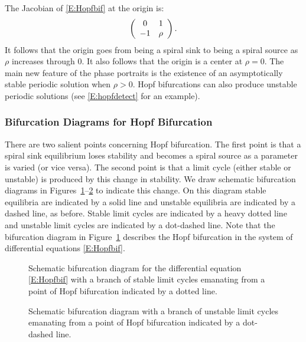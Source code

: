 \documentclass{ximera}
\begin{document}
The Jacobian of \eqref{E:Hopfbif} at the origin is:
\[
\left(\begin{array}{cc} 0 & 1\\ -1 &\rho\end{array}\right).
\]
It follows that the origin goes from being a 
spiral sink to being a 
spiral source 
as $\rho$ increases through $0$.  It also follows that  
the origin is a center at $\rho=0$.  
The main new feature of the phase portraits is the 
existence of an asymptotically stable 
periodic solution when $\rho>0$.  
Hopf bifurcations can also produce unstable periodic solutions
 (see \eqref{E:hopfdetect} for an example).   

\subsubsection*{Bifurcation Diagrams for Hopf Bifurcation}

There are two salient points concerning Hopf bifurcation.  The first point is 
that a spiral sink equilibrium loses stability and becomes a spiral source 
as a parameter is varied (or vice versa).  The second point is that a limit
cycle (either stable or unstable) is produced by this change in stability. 
We draw schematic bifurcation diagrams in
Figures~\ref{F:Hopfbifdiag}--\ref{F:Hopfbifdiag2} to indicate this change.  
On this diagram stable equilibria are indicated by a 
solid line and unstable equilibria are indicated by a dashed line, as before.
Stable limit cycles are indicated by a heavy dotted line and unstable limit 
cycles are indicated by a dot-dashed line.  Note that the bifurcation diagram
in Figure~\ref{F:Hopfbifdiag} describes the Hopf bifurcation in the system of
differential equations \eqref{E:Hopfbif}. 

\begin{figure}[htb]
           \centerline{%
           }
  \caption{Schematic bifurcation diagram for the differential equation 
    \protect\eqref{E:Hopfbif} with a branch of stable limit cycles emanating 
	from a point of Hopf bifurcation indicated by a dotted line.}
           \label{F:Hopfbifdiag}
\end{figure}

\begin{figure}[htb]
           \centerline{%
           }
  \caption{Schematic bifurcation diagram with a branch of unstable limit 
	cycles emanating from a point of Hopf bifurcation indicated by a 
	dot-dashed line.}
           \label{F:Hopfbifdiag2}
\end{figure}
\end{document}
